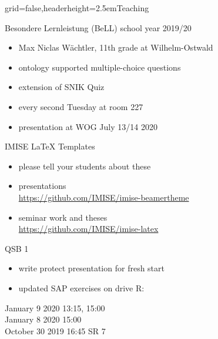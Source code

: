 \documentclass[english]{kiesgrube}
\begin{document}
\begin{poster}{grid=false,headerheight=2.5em}{}{Teaching}{}{}
\begin{posterbox}[name=person,column=0,row=0]{Besondere Lernleistung (BeLL) school year 2019/20}
\begin{itemize}
\item Max Niclas Wächtler, 11th grade at Wilhelm-Ostwald 
\item ontology supported multiple-choice questions
\item extension of SNIK Quiz
\item every second Tuesday at room 227
\item presentation at WOG July 13/14 2020\\ 
\end{itemize}
\end{posterbox}
\begin{posterbox}[name=risks,column=1,row=0]{IMISE LaTeX Templates}
\begin{itemize}
\item please tell your students about these
\item presentations\\ \url{https://github.com/IMISE/imise-beamertheme}
\item seminar work and theses\\ \url{https://github.com/IMISE/imise-latex}
\end{itemize}
\end{posterbox}
\begin{posterbox}[name=event,below=person]{QSB 1}
\begin{itemize}
\item write protect presentation for fresh start 
\item updated SAP exercises on drive R: 
\end{itemize}
January 9 2020 13:15, 15:00\\
January 8 2020 15:00\\
October 30 2019 16:45 SR 7\\
\end{posterbox}
\footer{}
\end{poster}
\end{document}
